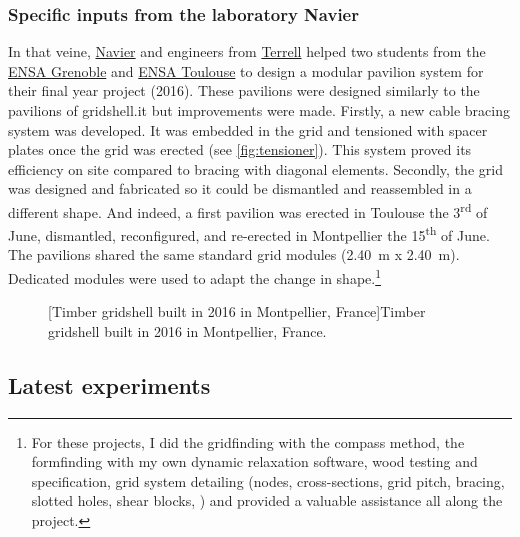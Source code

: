 \subsubsection{Specific inputs from the laboratory Navier}
In that veine, \href{http://navier.enpc.fr}{Navier} and engineers from \href{http://terrellgroup.net/index.php}{Terrell} helped two students from the \href{http://www.grenoble.archi.fr/en/school/educational-innovation.php}{ENSA Grenoble} and \href{http://www.toulouse.archi.fr/fr/index.html}{ENSA Toulouse} to design a modular pavilion system for their final year project (2016). These pavilions were designed similarly to the pavilions of gridshell.it but improvements were made. Firstly, a new cable bracing system was developed. It was embedded in the grid and tensioned with spacer plates once the grid was erected (see \cref{fig:tensioner}). This system proved its efficiency on site compared to bracing with diagonal elements. Secondly, the grid was designed and fabricated so it could be dismantled and reassembled in a different shape. And indeed, a first pavilion was erected in Toulouse the 3\textsuperscript{rd} of June, dismantled, reconfigured, and re-erected in Montpellier the 15\textsuperscript{th} of June. The pavilions shared the same standard grid modules (\SI{2.40}{m} x \SI{2.40}{m}). Dedicated modules were used to adapt the change in shape.\footnote{For these projects, I did the gridfinding with the compass method, the formfinding with my own dynamic relaxation software, wood testing and specification, grid system detailing (nodes, cross-sections, grid pitch, bracing, slotted holes, shear blocks, \telp{}) and provided a valuable assistance all along the project.}
\begin{figure}[h]
		\hspace*{\fill}
		\vspace{10pt}
		[Timber gridshell built in 2016 in Montpellier, France]{Timber gridshell built in 2016 in Montpellier, France.}
		\label{fig:jpofav}    
\end{figure}



\subsection{Latest experiments}

